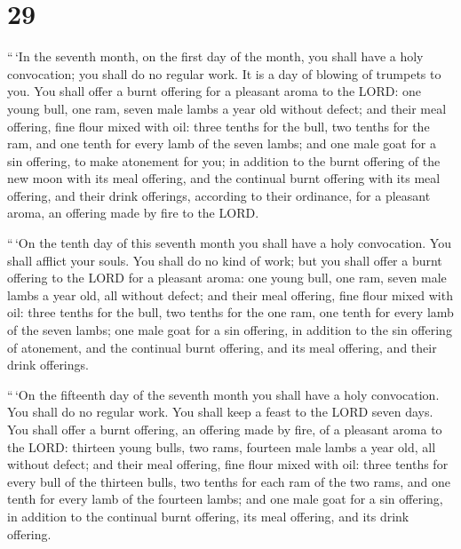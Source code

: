 \hypertarget{section-28}{%
\section{29}\label{section-28}}

 ``\,`In the seventh month, on the first day of the month,
you shall have a holy convocation; you shall do no regular work. It is a
day of blowing of trumpets to you.  You shall offer a burnt
offering for a pleasant aroma to the LORD: one young bull, one ram,
seven male lambs a year old without defect;  and their meal
offering, fine flour mixed with oil: three tenths for the bull, two
tenths for the ram,  and one tenth for every lamb of the
seven lambs;  and one male goat for a sin offering, to make
atonement for you;  in addition to the burnt offering of the
new moon with its meal offering, and the continual burnt offering with
its meal offering, and their drink offerings, according to their
ordinance, for a pleasant aroma, an offering made by fire to the LORD.

 ``\,`On the tenth day of this seventh month you shall have
a holy convocation. You shall afflict your souls. You shall do no kind
of work;  but you shall offer a burnt offering to the LORD
for a pleasant aroma: one young bull, one ram, seven male lambs a year
old, all without defect;  and their meal offering, fine
flour mixed with oil: three tenths for the bull, two tenths for the one
ram,  one tenth for every lamb of the seven lambs;
 one male goat for a sin offering, in addition to the sin
offering of atonement, and the continual burnt offering, and its meal
offering, and their drink offerings.

 ``\,`On the fifteenth day of the seventh month you shall
have a holy convocation. You shall do no regular work. You shall keep a
feast to the LORD seven days.  You shall offer a burnt
offering, an offering made by fire, of a pleasant aroma to the LORD:
thirteen young bulls, two rams, fourteen male lambs a year old, all
without defect;  and their meal offering, fine flour mixed
with oil: three tenths for every bull of the thirteen bulls, two tenths
for each ram of the two rams,  and one tenth for every lamb
of the fourteen lambs;  and one male goat for a sin
offering, in addition to the continual burnt offering, its meal
offering, and its drink offering.

